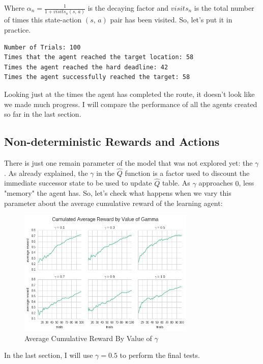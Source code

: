\documentclass[a4paper]{article}
\begin{document}
Where $\alpha_{n} = \frac{1}{1 + visits_{n}(s, \,a)}$ is the decaying factor and $visits_{n}$ is the total number of times this state-action $(s, \, a)$ pair has been visited. So, let's put it in practice.

\begin{lstlisting}
Number of Trials: 100
Times that the agent reached the target location: 58
Times the agent reached the hard deadline: 42
Times the agent successfully reached the target: 58
\end{lstlisting}

Looking just at the times the agent has completed the route, it doesn't look like we made much progress. I will compare the performance of all the agents created so far in the last section.

\subsection{Non-deterministic Rewards and Actions}
There is just one remain parameter of the model that was not explored yet:  the $\gamma$. As already explained, the $\gamma$ in the $\hat{Q}$ function is a factor used to discount the immediate successor state to be used to update $\hat{Q}$ table. As $\gamma$ approaches $0$, less "memory" the agent has. So, let's check what happens when we vary this parameter about the average cumulative reward of the learning agent:

\begin{figure}[ht!]
\centering
\includegraphics[width=0.75\textwidth]{images/cum_reward_by_gamma.png}
\caption{\label{fig:avg_cum_rwd}Average Cumulative Reward By Value of $\gamma$}
\end{figure}

In the last section, I will use $\gamma = 0.5$ to perform the final tests.
\end{document}
